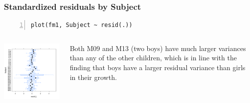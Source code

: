 \documentclass{beamer}
\begin{document}
\begin{frame}[fragile]
    \frametitle{Standardized residuals by Subject}
    \scriptsize\begin{Verbatim}[numbers=left,numbersep=6pt,frame=single]
plot(fm1, Subject ~ resid(.))
    \end{Verbatim}
    \begin{columns}
        \begin{column}{0.5\textwidth}
            \includegraphics[width=\textwidth]{lectures/day_7_diagnostics_of_mems/figures/unnamed-chunk-36-1.png}
        \end{column}
        \begin{column}{0.5\textwidth}
        \normalsize
            Both M09 and M13 (two boys) have much larger variances than any of the other children, which is in line with the finding that boys have a larger residual variance than girls in their growth.
        \end{column}
    \end{columns}
\end{frame}
\end{document}
